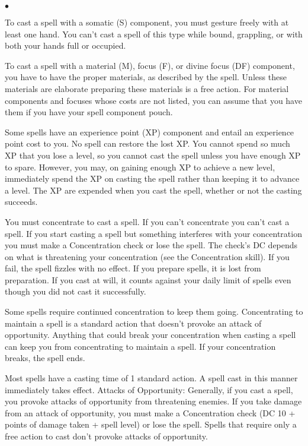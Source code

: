 \begin{list}{$\bullet$}{\itemspace} 
		\item To cast a spell with a somatic (S) component, you must gesture freely with at least one hand. You can't cast a spell of this type while bound, grappling, or with both your hands full or occupied.
			
		\item To cast a spell with a material (M), focus (F), or divine focus (DF) component, you have to have the proper materials, as described by the spell. Unless these materials are elaborate preparing these materials is a free action. For material components and focuses whose costs are not listed, you can assume that you have them if you have your spell component pouch.
				
		\item Some spells have an experience point (XP) component and entail an experience point cost to you. No spell can restore the lost XP. You cannot spend so much XP that you lose a level, so you cannot cast the spell unless you have enough XP to spare. However, you may, on gaining enough XP to achieve a new level, immediately spend the XP on casting the spell rather than keeping it to advance a level. The XP are expended when you cast the spell, whether or not the casting succeeds.
\end{list}
		
You must concentrate to cast a spell. If you can't concentrate you can't cast a spell. If you start casting a spell but something interferes with your concentration you must make a Concentration check or lose the spell. The check's DC depends on what is threatening your concentration (see the Concentration skill). If you fail, the spell fizzles with no effect. If you prepare spells, it is lost from preparation. If you cast at will, it counts against your daily limit of spells even though you did not cast it successfully.
		
Some spells require continued concentration to keep them going. Concentrating to maintain a spell is a standard action that doesn't provoke an attack of opportunity. Anything that could break your concentration when casting a spell can keep you from concentrating to maintain a spell. If your concentration breaks, the spell ends.

Most spells have a casting time of 1 standard action. A spell cast in this manner immediately takes effect.
Attacks of Opportunity: Generally, if you cast a spell, you provoke attacks of opportunity from threatening enemies. If you take damage from an attack of opportunity, you must make a Concentration check (DC 10 + points of damage taken + spell level) or lose the spell. Spells that require only a free action to cast don't provoke attacks of opportunity.

